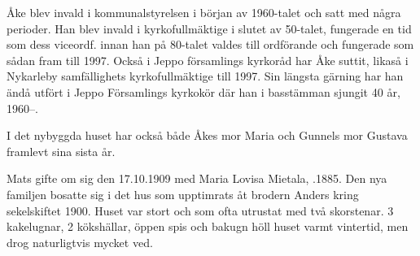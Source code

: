 Åke blev invald i kommunalstyrelsen i början av 1960-talet och satt med några perioder. Han blev invald i kyrkofullmäktige i slutet av 50-talet, fungerade en tid som dess viceordf. innan han på 80-talet valdes till ordförande och fungerade som sådan fram till 1997. Också i Jeppo församlings kyrkoråd har Åke suttit, likaså i Nykarleby samfällighets kyrkofullmäktige till 1997. Sin längsta gärning har han ändå utfört i Jeppo Församlings kyrkokör där han i basstämman sjungit 40 år, 1960--.
\begin{jhchildren}
  \item {}
  \item {}
  \item {}
\end{jhchildren}

I det nybyggda huset har också både Åkes mor Maria och Gunnels mor Gustava framlevt sina sista år.


%



%
Mats gifte om sig den 17.10.1909 med Maria Lovisa Mietala, .1885. Den nya familjen bosatte sig i det hus som upptimrats åt brodern Anders kring sekelskiftet 1900. Huset var stort och som ofta utrustat med två skorstenar. 3 kakelugnar, 2 kökshällar, öppen spis och bakugn höll huset varmt vintertid, men drog naturligtvis mycket ved.

